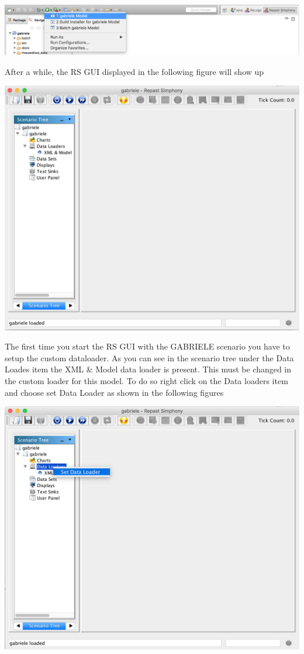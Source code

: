 \documentclass{book}
\begin{document}
\noindent
\includegraphics[scale=0.35]{fig_gabriele_rs_execution2}

After a while, the RS GUI displayed in the following figure will show up

\noindent
\includegraphics[scale=0.35]{fig_gabriele_rs_gui1}

The first time you start the RS GUI with the GABRIELE scenario you have to setup the custom dataloader. As you can see in the scenario tree under the Data Loades item the XML \& Model data loader is present. This must be changed in the custom loader for this model. To do so right click on the Data loaders item and choose set Data Loader as shown in the following figures


\noindent
\includegraphics[scale=0.35]{fig_gabriele_rs_gui2}
\end{document}
